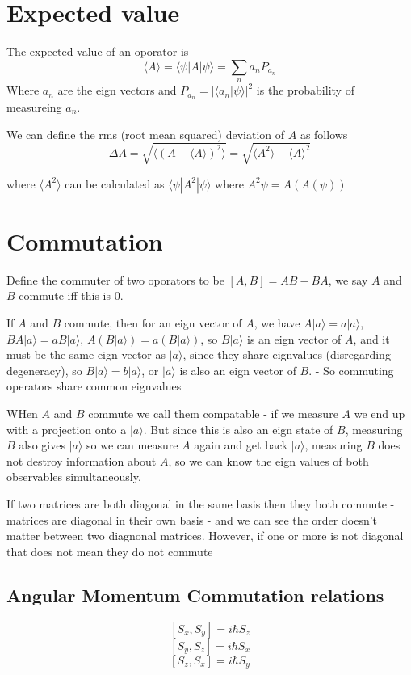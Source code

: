 \documentclass{homework}
\newcommand{\kt}{\rangle}
\newcommand{\bra}[1]{ \langle #1 |}
\begin{document}
\section{Expected value}

The expected value of an oporator is 
\[\langle A \rangle = \langle \psi | A | \psi \rangle = \sum_{n}a_nP_{a_n}\]
Where $a_n$ are the eign vectors and $P_{a_n} = |\bra{a_n} \psi \rangle|^2$ is the probability of measureing $a_n$. 

We can define the rms (root mean squared) deviation of $A$ as follows
\[\Delta A = \sqrt{\langle (A - \langle A \rangle)^2 \rangle} = \sqrt{\langle A^2 \rangle  - \langle A \rangle^2}\]

where $\langle A^2 \rangle$ can be calculated as $\langle \psi | A^2 | \psi \rangle$ where $A^2 \psi = A(A(\psi))$

\section{Commutation}

Define the commuter of two oporators to be $[A,B] = AB - BA$, we say $A$ and $B$ commute iff this is $0$.

If $A$ and $B$ commute, then for an eign vector of $A$, we have $A | a \kt = a | a \kt$, $BA | a \kt = aB | a \kt$, $A(B| a \kt) = a(B| a \kt)$, so $B| a \kt$ is an eign vector of $A$, and it must be the same eign vector as $| a \kt$, since they share eignvalues (disregarding degeneracy), so $B| a \kt = b| a \kt$, or $| a \kt$ is also an eign vector of $B$. - So commuting operators share common eignvalues

WHen $A$ and $B$ commute we call them compatable - if we measure $A$ we end up with a projection onto a $| a \kt$. But since this is also an eign state of $B$, measuring $B$ also gives $| a \kt$ so we can measure $A$ again and get back $| a \kt$, measuring $B$ does not destroy information about $A$, so we can know the eign values of both observables simultaneously.

If two matrices are both diagonal in the same basis then they both commute - matrices are diagonal in their own basis - and we can see the order doesn't matter between two diagnonal matrices. However, if one or more is not diagonal that does not mean they do not commute


\subsection{Angular Momentum Commutation relations}
\[[S_x,S_y] = i \hbar S_z\]
\[[S_y,S_z] = i \hbar S_x\]
\[[S_z,S_x] = i \hbar S_y\]
\end{document}
